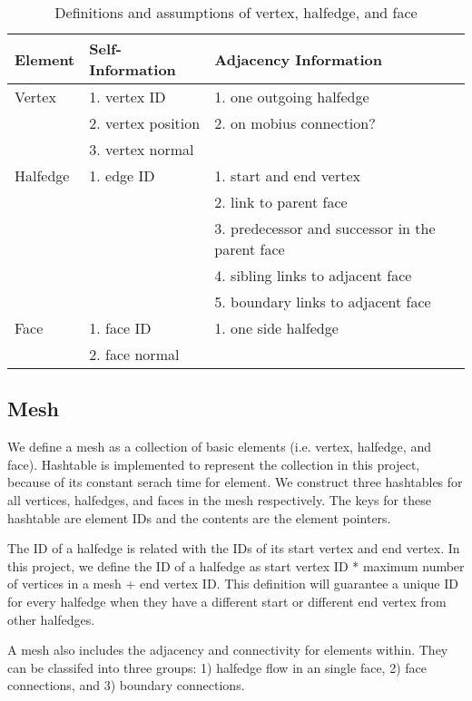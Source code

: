\documentclass[12pt]{article}
\begin{document}
\begin{table}[ht]
\centering
\begin{tabular}{| l | p{} | p{}|}

\hline
Element & Self-Information & Adjacency Information  \\
\hline
Vertex  & 1. vertex ID & 1. one outgoing halfedge   \\
& 2. vertex position & 2. on mobius connection? \\
& 3. vertex normal & \\
\hline
Halfedge & 1. edge ID & 1. start and end vertex\\
& & 2. link to parent face\\
& & 3. predecessor and successor in the parent face\\
& & 4. sibling links to adjacent face\\
& & 5. boundary links to adjacent face \\
\hline
Face    &  1. face ID & 1. one side halfedge\\
& 2. face normal &\\
\hline
\end{tabular}
\caption{Definitions and assumptions of vertex, halfedge, and face} 
\label{table:vhfInfo}
\end{table}

\subsection{Mesh}
We define a mesh as a collection of basic elements (i.e. vertex, halfedge, and face). Hashtable is implemented to represent the collection in this project, because of its constant serach time for element. We construct three hashtables for all vertices, halfedges, and faces in the mesh respectively. The keys for these hashtable are element IDs and the contents are the element pointers.

The ID of a halfedge is related with the IDs of its start vertex and end vertex. In this project, we define the ID of a halfedge as start vertex ID * maximum number of vertices in a mesh + end vertex ID. This definition will guarantee a unique ID for every halfedge when they have a different start or different end vertex from other halfedges. 

A mesh also includes the adjacency and connectivity for elements within. They can be classifed into three groups: 1) halfedge flow in an single face, 2) face connections, and 3) boundary connections.
\end{document}
